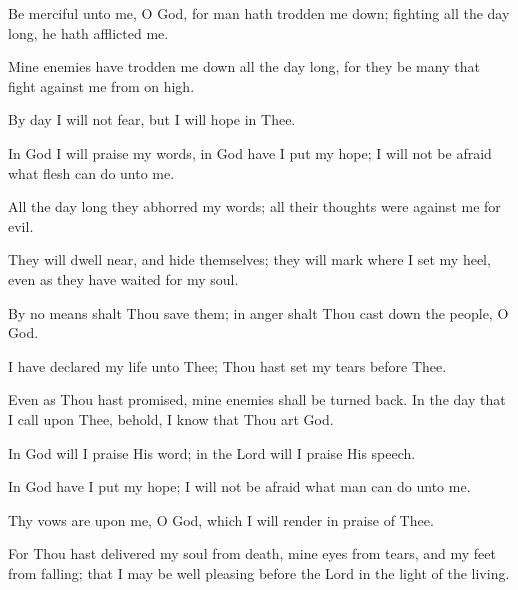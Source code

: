 Be merciful unto me, O God, for man hath trodden me down; fighting all the day long, he hath afflicted me.

Mine enemies have trodden me down all the day long, for they be many that fight against me from on high.

By day I will not fear, but I will hope in Thee.

In God I will praise my words, in God have I put my hope; I will not be afraid what flesh can do unto me.

All the day long they abhorred my words; all their thoughts were against me for evil.

They will dwell near, and hide themselves; they will mark where I set my heel, even as they have waited for my soul.

By no means shalt Thou save them; in anger shalt Thou cast down the people, O God.

I have declared my life unto Thee; Thou hast set my tears before Thee.

Even as Thou hast promised, mine enemies shall be turned back. In the day that I call upon Thee, behold, I know that Thou art God.

In God will I praise His word; in the Lord will I praise His speech.

In God have I put my hope; I will not be afraid what man can do unto me.

Thy vows are upon me, O God, which I will render in praise of Thee.

For Thou hast delivered my soul from death, mine eyes from tears, and my feet from falling; that I may be well pleasing before the Lord in the light of the living.
